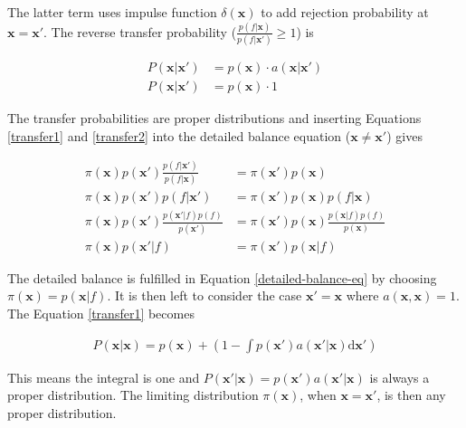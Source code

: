 \documentclass{article}
\begin{document}
The latter term uses impulse function $\delta(\mathbf{x})$ to add rejection probability at $\mathbf{x}=\mathbf{x}'$. The reverse transfer probability ($\frac{p(f|\mathbf{x})}{p(f|\mathbf{x}')} \geq 1$) is 

\begin{equation} \label{transfer2}
  \begin{aligned}
    P(\mathbf{x}|\mathbf{x}') &= p(\mathbf{x}) \cdot a(\mathbf{x}|\mathbf{x}') \\
    P(\mathbf{x}|\mathbf{x}') &= p(\mathbf{x}) \cdot 1
  \end{aligned}
\end{equation}

The transfer probabilities are proper distributions and inserting Equations \ref{transfer1} and \ref{transfer2}
into the detailed balance equation ($\mathbf{x} \neq \mathbf{x}'$) gives 

\begin{equation} \label{detailed-balance-eq}
  \begin{aligned}
    \pi(\mathbf{x}) p(\mathbf{x}') \frac{p(f|\mathbf{x}')}{p(f|\mathbf{x})} &= \pi(\mathbf{x}')p(\mathbf{x}) \\
    \pi(\mathbf{x}) p(\mathbf{x}') p(f|\mathbf{x}') &= \pi(\mathbf{x}')p(\mathbf{x})p(f|\mathbf{x}) \\
    \pi(\mathbf{x}) p(\mathbf{x}') \frac{p(\mathbf{x}'|f)p(f)}{p(\mathbf{x}')} &= \pi(\mathbf{x}')p(\mathbf{x})\frac{p(\mathbf{x}|f)p(f)}{p(\mathbf{x})} \\
    \pi(\mathbf{x}) p(\mathbf{x}'|f) &= \pi(\mathbf{x}')p(\mathbf{x}|f)
  \end{aligned}
\end{equation}

The detailed balance is fulfilled in Equation \ref{detailed-balance-eq} by choosing $\pi(\mathbf{x}) = p(\mathbf{x}|f)$. It is then left to consider the case $\mathbf{x}' = \mathbf{x}$ where $a(\mathbf{x},\mathbf{x}) = 1$. The Equation \ref{transfer1} becomes 

\begin{equation} \label{transfer3}
  \begin{gathered}
    P(\mathbf{x}|\mathbf{x}) = p(\mathbf{x}) + \left(1 - \int p(\mathbf{x}') a(\mathbf{x}'|\mathbf{x}) \mathrm{d}\mathbf{x}'\right) 
  \end{gathered}
\end{equation}

This means the integral is one and $P(\mathbf{x}'|\mathbf{x}) = p(\mathbf{x}') a(\mathbf{x}'|\mathbf{x})$ is always a proper distribution. The limiting distribution $\pi(\mathbf{x})$, when $\mathbf{x}=\mathbf{x}'$, is then any proper distribution.
\end{document}
